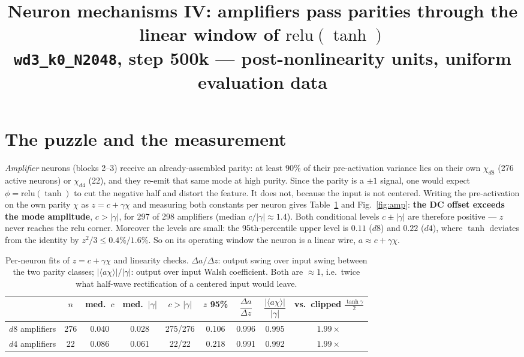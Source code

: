 \documentclass[10pt]{article}
\title{\vspace{-1.4cm}Neuron mechanisms IV: amplifiers pass parities through the linear
window of $\mathrm{relu}(\tanh)$\\
\large \texttt{wd3\_k0\_N2048}, step 500k --- post-nonlinearity units, uniform evaluation data}
\author{}\date{\vspace{-1.2cm}}
\begin{document}
\maketitle\vspace{-1.9cm}

\section*{The puzzle and the measurement}
\emph{Amplifier} neurons (blocks 2--3) receive an already-assembled parity: at least $90\%$
of their pre-activation variance lies on their own $\chi_{d8}$ (276 active neurons) or
$\chi_{d4}$ (22), and they re-emit that same mode at high purity. Since the parity is a
$\pm1$ signal, one would expect $\phi=\mathrm{relu}(\tanh)$ to cut the negative half and
distort the feature. It does not, because the input is not centered. Writing the
pre-activation on the own parity $\chi$ as $z = c + \gamma\chi$ and measuring both constants
per neuron gives Table~\ref{tab} and Fig.~\ref{fig:amp}: \textbf{the DC offset exceeds the
mode amplitude}, $c > |\gamma|$, for 297 of 298 amplifiers (median $c/|\gamma|\approx1.4$).
Both conditional levels $c\pm|\gamma|$ are therefore positive --- $z$ never reaches the relu
corner. Moreover the levels are small: the 95th-percentile upper level is $0.11$ ($d8$) and
$0.22$ ($d4$), where $\tanh$ deviates from the identity by $z^2/3\leq0.4\%/1.6\%$. So on its
operating window the neuron is a linear wire, $a\approx c+\gamma\chi$.

\begin{table}[h!]\centering\small
\begin{tabular}{lcccccccc}
\toprule
 & $n$ & med.\ $c$ & med.\ $|\gamma|$ & $c>|\gamma|$ & $z$ 95\% & $\dfrac{\Delta a}{\Delta z}$ &
 $\dfrac{|\langle a\chi\rangle|}{|\gamma|}$ & vs.\ clipped $\tfrac{\tanh\gamma}{2}$ \\
\midrule
$d8$ amplifiers & 276 & 0.040 & 0.028 & 275/276 & 0.106 & 0.996 & 0.995 & $1.99\times$ \\
$d4$ amplifiers & 22 & 0.086 & 0.061 & 22/22 & 0.218 & 0.991 & 0.992 & $1.99\times$ \\
\bottomrule
\end{tabular}
\caption{Per-neuron fits of $z=c+\gamma\chi$ and linearity checks. $\Delta a/\Delta z$: output
swing over input swing between the two parity classes; $|\langle a\chi\rangle|/|\gamma|$:
output over input Walsh coefficient. Both are $\approx\!1$, i.e.\ twice what half-wave
rectification of a centered input would leave.}
\label{tab}
\end{table}
\end{document}
